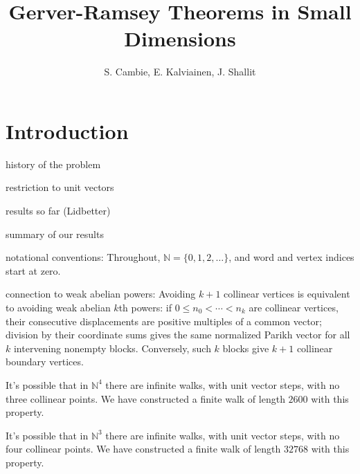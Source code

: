 \documentclass[12pt,reqno]{article}
\newcommand{\N}{\mathbb N}
\begin{document}
\theoremstyle{plain}
\newtheorem{theorem}{Theorem}
\newtheorem{corollary}[theorem]{Corollary}
\newtheorem{lemma}[theorem]{Lemma}
\newtheorem{proposition}[theorem]{Proposition}

\theoremstyle{definition}
\newtheorem{definition}[theorem]{Definition}
\newtheorem{example}[theorem]{Example}
\newtheorem{conjecture}[theorem]{Conjecture}

\theoremstyle{remark}
\newtheorem{remark}[theorem]{Remark}

\author{S. Cambie, E. Kalviainen, J. Shallit}

\title{Gerver-Ramsey Theorems in Small Dimensions}

\maketitle

\begin{abstract}

\end{abstract}

\section{Introduction}

history of the problem

restriction to unit vectors

results so far (Lidbetter)

summary of our results

notational conventions:  Throughout, $\N=\{0,1,2,\ldots\}$, and word and vertex indices start
at zero.

connection to weak abelian powers:  Avoiding $k+1$ collinear vertices is equivalent to avoiding weak abelian
$k$th powers: if $0\leq n_0<\cdots<n_k$ are collinear vertices, their
consecutive displacements are positive multiples of a common vector;
division by their coordinate sums gives the same normalized Parikh
vector for all $k$ intervening nonempty blocks. Conversely, such $k$
blocks give $k+1$ collinear boundary vertices.

It's possible that in $\N^4$ there are infinite walks, with unit vector steps, with no three collinear points.  We have constructed a finite walk of length $2600$ with this property.

It's possible that in $\N^3$ there are infinite walks, with unit vector steps, with no four collinear points.  We have constructed a finite walk of length $32768$ with this property.
\end{document}
